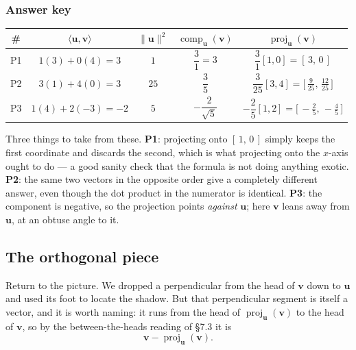 \documentclass[11pt]{article}
\theoremstyle{definition}
\theoremstyle{remark}
\newcommand{\vc}[1]{\mathbf{#1}}
\newcommand{\norm}[1]{\lVert #1\rVert}
\newcommand{\proj}[2]{\operatorname{proj}_{#1}(#2)}
\newcommand{\comp}[2]{\operatorname{comp}_{#1}(#2)}
\begin{document}
\subsubsection*{Answer key}
\begin{center}
\renewcommand{\arraystretch}{2.2}   %
\begin{tabular}{@{}c c c c c@{}}
\toprule
\textbf{\#} & $\langle\vc{u},\vc{v}\rangle$ & $\norm{\vc{u}}^{2}$
            & $\comp{\vc{u}}{\vc{v}}$ & $\proj{\vc{u}}{\vc{v}}$ \\
\midrule
P1 & $1(3)+0(4)=3$    & $1$  & $\dfrac{3}{1}=3$
   & $\dfrac{3}{1}[1,0]=[\,3,\,0\,]$ \\
P2 & $3(1)+4(0)=3$    & $25$ & $\dfrac{3}{5}$
   & $\dfrac{3}{25}[3,4]=\bigl[\,\tfrac{9}{25},\,\tfrac{12}{25}\,\bigr]$ \\
P3 & $1(4)+2(-3)=-2$  & $5$  & $-\dfrac{2}{\sqrt5}$
   & $-\dfrac{2}{5}[1,2]=\bigl[\,-\tfrac{2}{5},\,-\tfrac{4}{5}\,\bigr]$ \\
\bottomrule
\end{tabular}
\end{center}

\noindent Three things to take from these. \textbf{P1}: projecting onto
$[\,1,\,0\,]$ simply keeps the first coordinate and discards the second, which
is what projecting onto the $x$-axis ought to do --- a good sanity check that
the formula is not doing anything exotic. \textbf{P2}: the same two vectors in
the opposite order give a completely different answer, even though the dot
product in the numerator is identical. \textbf{P3}: the component is negative,
so the projection points \emph{against} $\vc{u}$; here $\vc{v}$ leans away from
$\vc{u}$, at an obtuse angle to it.

\subsection{The orthogonal piece}
Return to the picture. We dropped a perpendicular from the head of $\vc{v}$ down
to $\vc{u}$ and used its foot to locate the shadow. But that perpendicular
segment is itself a vector, and it is worth naming: it runs from the head of
$\proj{\vc{u}}{\vc{v}}$ to the head of $\vc{v}$, so by the between-the-heads
reading of \S7.3 it is
\[
  \vc{v}-\proj{\vc{u}}{\vc{v}} .
\]
\end{document}
